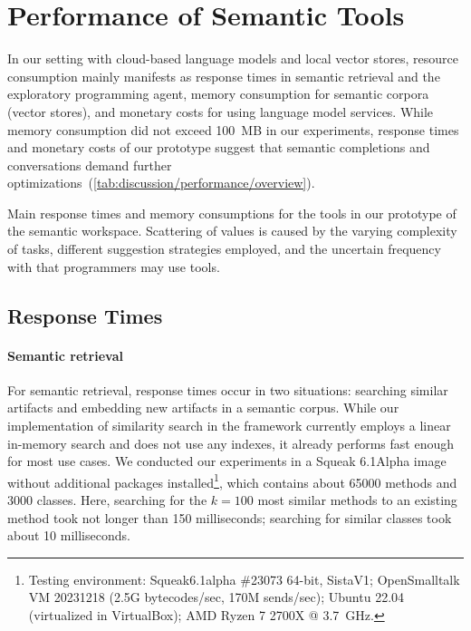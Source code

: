 
\section{Performance of Semantic Tools}
\label{sec:discussion/performance}

In our setting with cloud-based language models and local vector stores, resource consumption mainly manifests as response times in semantic retrieval and the exploratory programming agent, memory consumption for semantic corpora (vector stores), and monetary costs for using language model services.
While memory consumption did not exceed \qty{100}{MB} in our experiments, response times and monetary costs of our prototype suggest that semantic completions and conversations demand further optimizations~(\cref{tab:discussion/performance/overview}).

\begin{table}
	\centering
	\footnotesize
	\caption[Main response times and memory consumptions for the tools in our prototype of the semantic workspace.]{
		Main response times and memory consumptions for the tools in our prototype of the semantic workspace.
		Scattering of values is caused by the varying complexity of tasks, different suggestion strategies employed, and the uncertain frequency with that programmers may use tools.
	}
	\label{tab:discussion/performance/overview}
\end{table}

\subsection*{Response Times}
\label{sec:discussion/performance/latencies}

\paragraph{Semantic retrieval}
\label{par:discussion/performance/latencies/retrieval}

For semantic retrieval, response times occur in two situations: searching similar artifacts and embedding new artifacts in a semantic corpus.
While our implementation of similarity search in the \semtex framework currently employs a linear in-memory search and does not use any indexes, it already performs fast enough for most use cases.
We conducted our experiments in a Squeak 6.1Alpha image without additional packages installed\footnote{Testing environment: Squeak6.1alpha \#23073 64-bit, SistaV1; OpenSmalltalk VM 20231218 (2.5G bytecodes/sec, 170M sends/sec); Ubuntu 22.04 (virtualized in VirtualBox); AMD Ryzen 7 2700X @ \qty{3.7}{GHz}.}, which contains about \num{65000} methods and \num{3000} classes.
Here, searching for the $k = 100$ most similar methods to an existing method took not longer than 150 milliseconds; searching for similar classes took about 10 milliseconds.

